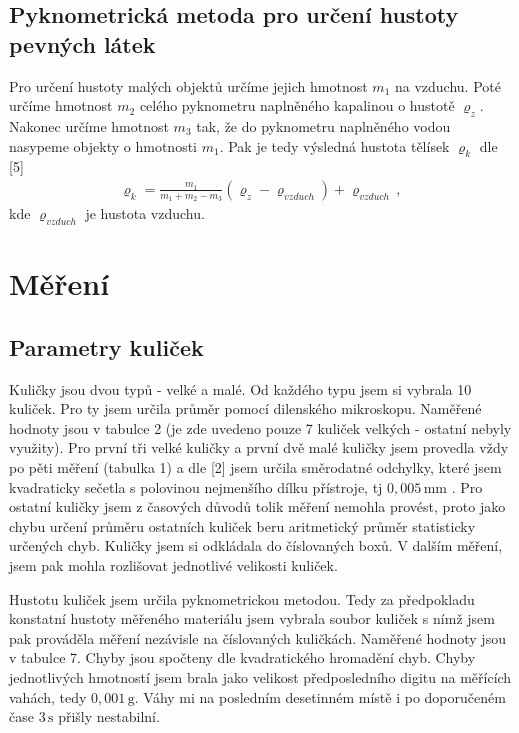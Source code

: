 \documentclass[a4paper,12pt]{article}
\begin{document}
\subsection{Pyknometrická metoda pro určení hustoty pevných látek}
Pro určení hustoty malých objektů určíme jejich hmotnost $m_1$ na vzduchu. 
Poté určíme hmotnost $m_2$ celého pyknometru naplněného kapalinou o hustotě 
$\varrho_z$. Nakonec určíme hmotnost $m_3$ tak, že do pyknometru naplněného 
vodou nasypeme objekty o hmotnosti $m_1$. Pak je tedy výsledná hustota tělísek 
$\varrho_k$ dle [5]
\begin{eqnarray}
\varrho_k = \frac{m_1}{m_1+m_2-m_3}(\varrho_z-\varrho_{vzduch})+\varrho_{vzduch} \, , \label{pyknometr}
\end{eqnarray}
kde $\varrho_{vzduch}$ je hustota vzduchu.


\section{Měření}

\subsection{Parametry kuliček}


Kuličky jsou dvou typů - velké a malé. Od každého typu jsem si vybrala 
10 kuliček. Pro ty jsem určila průměr pomocí dilenského mikroskopu. Naměřené hodnoty 
jsou v tabulce 2 (je zde uvedeno pouze 7 kuliček velkých - ostatní nebyly využity). 
Pro první tři velké kuličky a první dvě malé kuličky 
jsem provedla vždy po pěti měření (tabulka 1) a dle [2] jsem určila směrodatné odchylky, které jsem 
kvadraticky sečetla s polovinou nejmenšího dílku přístroje, tj $0,005 \, \mathrm{mm}$ . Pro ostatní 
kuličky jsem z časových důvodů tolik měření nemohla provést, proto jako chybu 
určení průměru ostatních kuliček beru aritmetický průměr statisticky určených chyb. Kuličky jsem si odkládala do číslovaných boxů. 
V dalším měření, jsem pak mohla rozlišovat jednotlivé velikosti kuliček.

Hustotu kuliček jsem určila pyknometrickou metodou. Tedy za předpokladu 
konstatní hustoty měřeného materiálu jsem vybrala soubor kuliček s nímž jsem 
pak prováděla měření nezávisle na číslovaných kuličkách. Naměřené hodnoty 
jsou v tabulce 7. Chyby jsou spočteny dle kvadratického 
hromadění chyb. Chyby jednotlivých hmotností jsem brala jako 
velikost předposledního digitu na měřících vahách, tedy $0,001 \, \mathrm{g}$.
Váhy mi na posledním desetinném místě i po doporučeném čase $3 \, \mathrm{s}$
přišly nestabilní.
\end{document}
